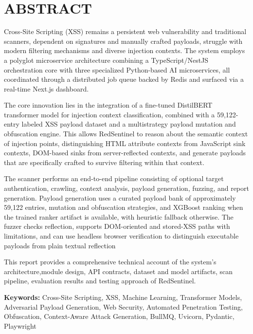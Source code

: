 \chapter*{\MakeUppercase{Abstract}}
Cross-Site Scripting (XSS) remains a persistent web vulnerability and traditional scanners, dependent on signatures and manually crafted payloads, struggle with modern filtering mechanisms and diverse injection contexts. The system employs a polyglot microservice architecture combining a TypeScript/NestJS orchestration core with three specialized Python-based AI microservices, all coordinated through a distributed job queue backed by Redis and surfaced via a real-time Next.js dashboard.

The core innovation lies in the integration of a fine-tuned DistilBERT transformer model for injection context classification, combined with a 59,122-entry labeled XSS payload dataset and a multistrategy payload mutation and obfuscation engine. This allows RedSentinel to reason about the semantic context of injection points, distinguishing HTML attribute contexts from JavaScript sink contexts, DOM-based sinks from server-reflected contexts, and generate payloads that are specifically crafted to survive filtering within that context.

The scanner performs an end-to-end pipeline consisting of optional target authentication, crawling, context analysis, payload generation, fuzzing, and report generation. Payload generation uses a curated payload bank of approximately 59,122 entries, mutation and obfuscation strategies, and XGBoost ranking when the trained ranker artifact is available, with heuristic fallback otherwise. The fuzzer checks reflection, supports DOM-oriented and stored-XSS paths with limitations, and can use headless browser verification to distinguish executable payloads from plain textual reflection

This report provides a comprehensive technical account of the system's architecture,module design, API contracts, dataset and model artifacts, scan pipeline, evaluation results and testing approach of RedSentinel.
\vspace{1cm}

\noindent\textbf{Keywords:} Cross-Site Scripting, XSS, Machine Learning, Transformer Models, Adversarial Payload Generation, Web Security, Automated Penetration Testing, Obfuscation, Context-Aware Attack Generation, BullMQ, Uvicorn, Pydantic, Playwright
